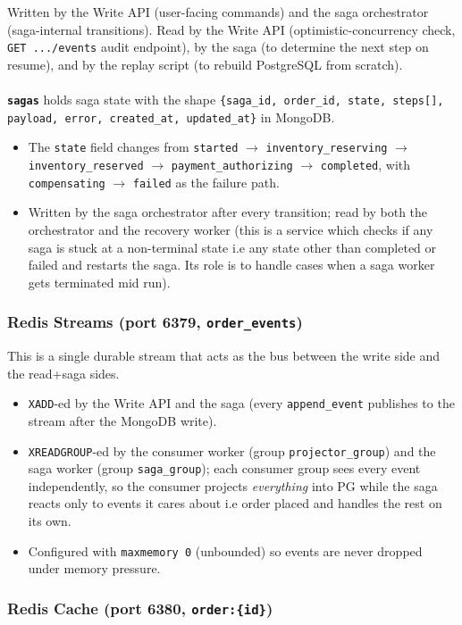\documentclass[11pt,a4paper]{article}
\newcommand{\code}[1]{\texttt{\small #1}}
\begin{document}
Written by the Write API (user-facing commands) and the saga orchestrator (saga-internal transitions). Read by the Write API (optimistic-concurrency check, \code{GET .../events} audit endpoint), by the saga (to determine the next step on resume), and by the replay script (to rebuild PostgreSQL from scratch).\\\\
\textbf{\code{sagas}} holds saga state with the shape \code{\{saga\_id, order\_id, state, steps[], payload, error, created\_at, updated\_at\}} in MongoDB.
  \begin{itemize}
    \item The \code{state} field changes from \code{started} $\to$ \code{inventory\_reserving} $\to$ \code{inventory\_reserved} $\to$ \code{payment\_authorizing} $\to$ \code{completed}, with \code{compensating} $\to$ \code{failed} as the failure path.
    \item Written by the saga orchestrator after every transition; read by both the orchestrator and the recovery worker (this is a service which checks if any saga is stuck at a non-terminal state i.e any state other than completed or failed and restarts the saga. Its role is to handle cases when a saga worker gets terminated mid run).
  \end{itemize}

\subsubsection{Redis Streams (port 6379, \code{order\_events})}
This is a single durable stream that acts as the bus between the write side and the read+saga sides.
  \begin{itemize}
    \item \code{XADD}-ed by the Write API and the saga (every \code{append\_event} publishes to the stream after the MongoDB write).
    \item \code{XREADGROUP}-ed by the consumer worker (group \code{projector\_group}) and the saga worker (group \code{saga\_group}); each consumer group sees every event independently, so the consumer projects \emph{everything} into PG while the saga reacts only to events it cares about i.e order placed and handles the rest on its own.
    \item Configured with \code{maxmemory 0} (unbounded) so events are never dropped under memory pressure.
  \end{itemize}

\subsubsection{Redis Cache (port 6380, \code{order:\{id\}})}
\end{document}
